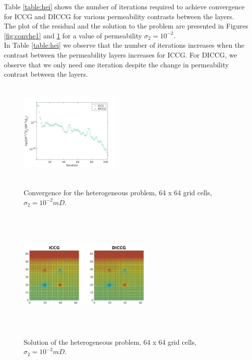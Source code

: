 \documentclass[12pt]{article}
\begin{document}
Table \ref{table:hei} shows the number of iterations required to achieve convergence 
for ICCG and DICCG for various permeability contrasts between the layers. \\
The plot of the residual and the solution 
to the problem are presented in Figures \ref{fig:convhe1} and \ref{fig:solhe1} for a value of permeability $\sigma_2=10^{-2}$.\\
In Table \ref{table:hei} we observe that the number of 
iterations increases when the contrast between the permeability layers increases for ICCG. For DICCG, 
we observe that we only need one iteration despite the change in permeability contrast between the layers.
\begin{figure}[!h]
\centering
\begin{minipage}{.4\textwidth}
 \centering
\includegraphics[width=5cm,height=5cm,keepaspectratio]
{images_prev/conv_4w.jpg}
\caption{Convergence for the heterogeneous problem, 64 x 64 grid cells,  $\sigma_2=10^{-2}mD$.}
\label{fig:convhe1}
\end{minipage}%
\hspace{10pt}
\begin{minipage}{.4\textwidth} 
\centering 
\includegraphics[width=6.5cm,height=6.5cm,keepaspectratio]
{images_prev/sol_4w.jpg}
\caption{Solution of the heterogeneous problem, 64 x 64 grid cells, $\sigma_2=10^{-2}mD$.}
\label{fig:solhe1}
\end{minipage}
\end{figure}
\end{document}
